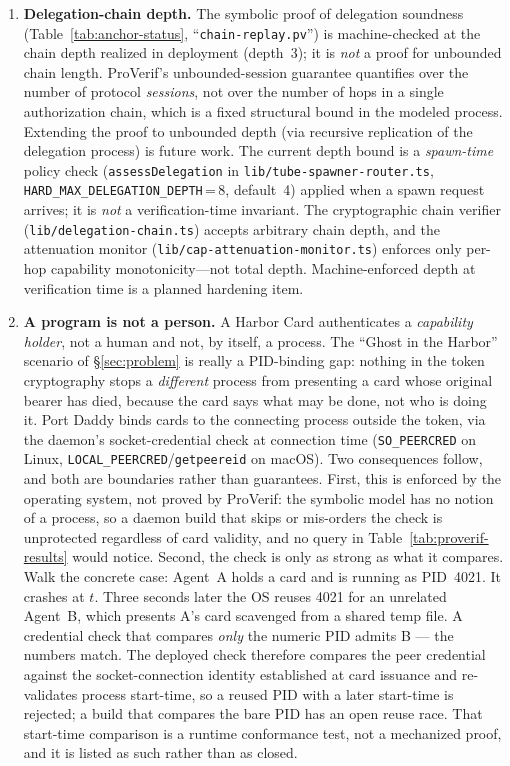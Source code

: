 \documentclass[11pt,a4paper]{article}
\theoremstyle{definition}
\begin{document}
\begin{enumerate}
  \item \textbf{Delegation-chain depth.} The symbolic proof of delegation soundness (Table~\ref{tab:anchor-status}, ``\texttt{chain-replay.pv}'') is machine-checked at the chain depth realized in deployment (depth~3); it is \emph{not} a proof for unbounded chain length. ProVerif's unbounded-session guarantee quantifies over the number of protocol \emph{sessions}, not over the number of hops in a single authorization chain, which is a fixed structural bound in the modeled process. Extending the proof to unbounded depth (via recursive replication of the delegation process) is future work. The current depth bound is a \emph{spawn-time} policy check (\texttt{assessDelegation} in \texttt{lib/tube-spawner-router.ts}, \texttt{HARD\_MAX\_DELEGATION\_DEPTH}\,=\,8, default~4) applied when a spawn request arrives; it is \emph{not} a verification-time invariant. The cryptographic chain verifier (\texttt{lib/delegation-chain.ts}) accepts arbitrary chain depth, and the attenuation monitor (\texttt{lib/cap-attenuation-monitor.ts}) enforces only per-hop capability monotonicity---not total depth. Machine-enforced depth at verification time is a planned hardening item.
  \item \textbf{A program is not a person.} A Harbor Card authenticates a \emph{capability holder}, not a human and not, by itself, a process. The ``Ghost in the Harbor'' scenario of \S\ref{sec:problem} is really a PID-binding gap: nothing in the token cryptography stops a \emph{different} process from presenting a card whose original bearer has died, because the card says what may be done, not who is doing it. Port Daddy binds cards to the connecting process outside the token, via the daemon's socket-credential check at connection time (\texttt{SO\_PEERCRED} on Linux, \texttt{LOCAL\_PEERCRED}/\texttt{getpeereid} on macOS). Two consequences follow, and both are boundaries rather than guarantees. First, this is enforced by the operating system, not proved by ProVerif: the symbolic model has no notion of a process, so a daemon build that skips or mis-orders the check is unprotected regardless of card validity, and no query in Table~\ref{tab:proverif-results} would notice. Second, the check is only as strong as what it compares. Walk the concrete case: Agent~A holds a card and is running as PID~4021. It crashes at $t$. Three seconds later the OS reuses 4021 for an unrelated Agent~B, which presents A's card scavenged from a shared temp file. A credential check that compares \emph{only} the numeric PID admits B --- the numbers match. The deployed check therefore compares the peer credential against the socket-connection identity established at card issuance and re-validates process start-time, so a reused PID with a later start-time is rejected; a build that compares the bare PID has an open reuse race. That start-time comparison is a runtime conformance test, not a mechanized proof, and it is listed as such rather than as closed.

\end{enumerate}
\end{document}
